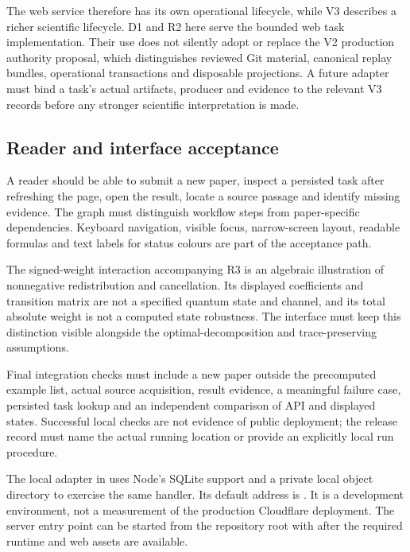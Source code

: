 The web service therefore has its own operational lifecycle, while V3 describes a richer scientific lifecycle. D1 and R2 here serve the bounded web task implementation. Their use does not silently adopt or replace the V2 production authority proposal, which distinguishes reviewed Git material, canonical replay bundles, operational transactions and disposable projections. A future adapter must bind a task's actual artifacts, producer and evidence to the relevant V3 records before any stronger scientific interpretation is made.

\subsection{Reader and interface acceptance}

A reader should be able to submit a new paper, inspect a persisted task after refreshing the page, open the result, locate a source passage and identify missing evidence. The graph must distinguish workflow steps from paper-specific dependencies. Keyboard navigation, visible focus, narrow-screen layout, readable formulas and text labels for status colours are part of the acceptance path.

The signed-weight interaction accompanying R3 is an algebraic illustration of nonnegative redistribution and cancellation. Its displayed coefficients and transition matrix are not a specified quantum state and channel, and its total absolute weight is not a computed state robustness. The interface must keep this distinction visible alongside the optimal-decomposition and trace-preserving assumptions.

Final integration checks must include a new paper outside the precomputed example list, actual source acquisition, result evidence, a meaningful failure case, persisted task lookup and an independent comparison of API and displayed states. Successful local checks are not evidence of public deployment; the release record must name the actual running location or provide an explicitly local run procedure.

The local adapter in  uses Node's SQLite support and a private local object directory to exercise the same handler. Its default address is . It is a development environment, not a measurement of the production Cloudflare deployment. The server entry point can be started from the repository root with  after the required runtime and web assets are available.

